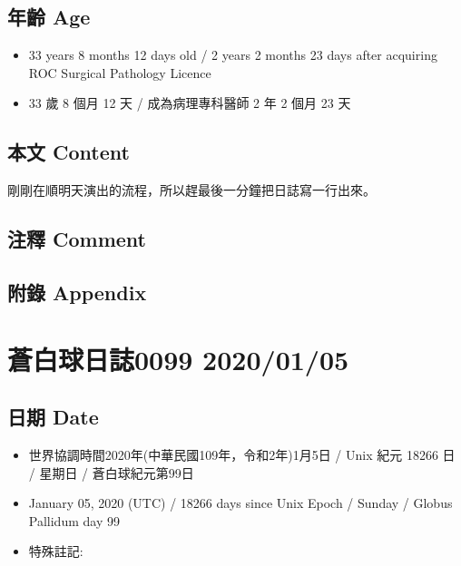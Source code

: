 \documentclass[
]{article}
\providecommand{\tightlist}{%
  \setlength{\itemsep}{0pt}\setlength{\parskip}{0pt}}
\begin{document}
\hypertarget{ux5e74ux9f61-age-34}{%
\subsection{年齡 Age}\label{ux5e74ux9f61-age-34}}

\begin{itemize}
\tightlist
\item
  33 years 8 months 12 days old / 2 years 2 months 23 days after
  acquiring ROC Surgical Pathology Licence
\item
  33 歲 8 個月 12 天 / 成為病理專科醫師 2 年 2 個月 23 天
\end{itemize}

\hypertarget{ux672cux6587-content-34}{%
\subsection{本文 Content}\label{ux672cux6587-content-34}}

剛剛在順明天演出的流程，所以趕最後一分鐘把日誌寫一行出來。

\hypertarget{ux6ce8ux91cb-comment-33}{%
\subsection{注釋 Comment}\label{ux6ce8ux91cb-comment-33}}

\hypertarget{ux9644ux9304-appendix-34}{%
\subsection{附錄 Appendix}\label{ux9644ux9304-appendix-34}}

\hypertarget{ux84bcux767dux7403ux65e5ux8a8c0099-20200105}{%
\section{蒼白球日誌0099
2020/01/05}\label{ux84bcux767dux7403ux65e5ux8a8c0099-20200105}}

\hypertarget{ux65e5ux671f-date-35}{%
\subsection{日期 Date}\label{ux65e5ux671f-date-35}}

\begin{itemize}
\tightlist
\item
  世界協調時間2020年(中華民國109年，令和2年)1月5日 / Unix 紀元 18266 日
  / 星期日 / 蒼白球紀元第99日
\item
  January 05, 2020 (UTC) / 18266 days since Unix Epoch / Sunday / Globus
  Pallidum day 99
\item
  特殊註記:
\end{itemize}
\end{document}
